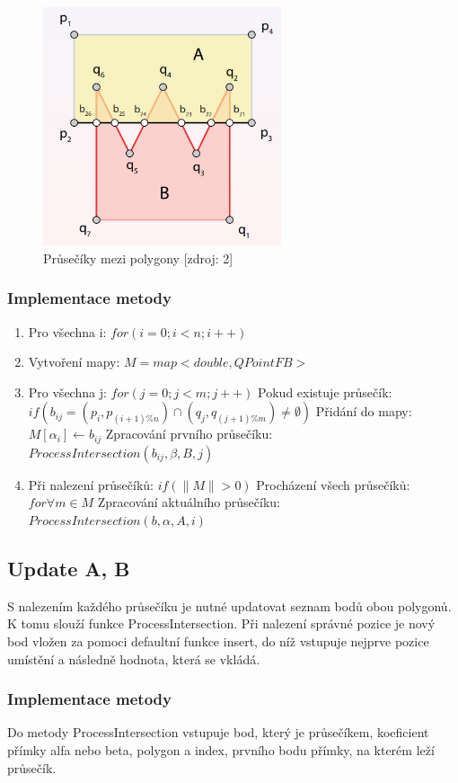 \documentclass[a4paper, 12pt]{article}
\begin{document}
\begin{figure}[h!]
	\centering
	\includegraphics[width=7cm]{pictures/prusecikypolygon.png}
	\caption{Průsečíky mezi polygony [zdroj: 2]}
\end{figure}

\subsubsection{Implementace metody}
\begin{enumerate}
\item Pro všechna i: $for (i = 0; i < n; i++)$
\item Vytvoření mapy: $ M = map<double, QPointFB>$
\item Pro všechna j: $for (j = 0; j < m; j++)$
\subitem Pokud existuje průsečík: $if (b_{ij} = (p_i, p_{(i+1)\%n}) \cap (q_j, q_{(j+1)\%m})  \neq \emptyset  )$
\subitem Přidání do mapy: $M[\alpha_i] \leftarrow b_{ij}$
\subitem Zpracování prvního průsečíku: $ProcessIntersection (b_{ij}, \beta, B, j)$
\item Při nalezení průsečíků: $if (\| M \| > 0) $
\subitem Procházení všech průsečíků: $for \forall m \in M$
\subitem Zpracování aktuálního průsečíku: $ProcessIntersection(b, \alpha, A, i)$

\end{enumerate}


\subsection{Update A, B}
S nalezením každého průsečíku je nutné updatovat seznam bodů obou polygonů. K tomu slouží funkce ProcessIntersection. Při nalezení správné pozice je nový bod vložen za pomoci defaultní funkce insert, do níž vstupuje nejprve pozice umístění a následně hodnota, která se vkládá.

\subsubsection{Implementace metody}
Do metody ProcessIntersection vstupuje bod, který je průsečíkem, koeficient přímky alfa nebo beta, polygon a index, prvního bodu přímky, na kterém leží průsečík.
\end{document}
